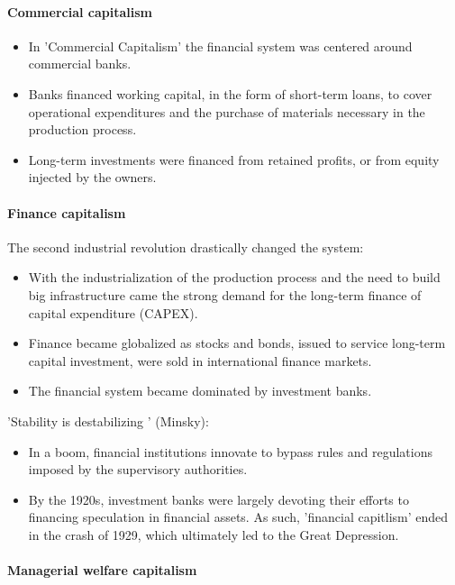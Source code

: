 \paragraph{Commercial capitalism}

\begin{itemize}
    \item In 'Commercial Capitalism' the financial system was centered
        around commercial banks.
    \item Banks financed working capital, in the form of short-term loans,
        to cover operational expenditures and the purchase of materials
        necessary in the production process.
    \item Long-term investments were financed from retained profits, or
        from equity injected by the owners.
\end{itemize}

\paragraph{Finance capitalism}

The second industrial revolution drastically changed the system:
\begin{itemize}
    \item With the industrialization of the production process and the
        need to build big infrastructure came the strong demand for the
        long-term finance of capital expenditure (CAPEX).
    \item Finance became globalized as stocks and bonds, issued to service
        long-term capital investment, were sold in international finance
        markets.
    \item The financial system became dominated by investment banks.
\end{itemize}

'Stability is destabilizing ' (Minsky):
\begin{itemize}
    \item In a boom, financial institutions innovate to bypass rules and
        regulations imposed by the supervisory authorities.
    \item By the 1920s, investment banks were largely devoting their efforts
        to financing speculation in financial assets. As such, 'financial
        capitlism' ended in the crash of 1929, which ultimately led to
        the Great Depression.
\end{itemize}

\paragraph{Managerial welfare capitalism}

